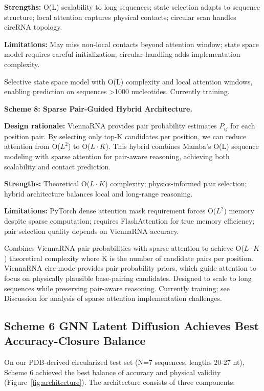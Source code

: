 \documentclass[12pt]{article}
\begin{document}
\textbf{Strengths:} O(L) scalability to long sequences; state selection adapts to sequence structure; local attention captures physical contacts; circular scan handles circRNA topology.

\textbf{Limitations:} May miss non-local contacts beyond attention window; state space model requires careful initialization; circular handling adds implementation complexity.

Selective state space model \citep{gu2023} with O(L) complexity and local attention windows, enabling prediction on sequences >1000 nucleotides. Currently training.

\textbf{Scheme 8: Sparse Pair-Guided Hybrid Architecture.}

\textbf{Design rationale:} ViennaRNA provides pair probability estimates $P_{ij}$ for each position pair. By selecting only top-K candidates per position, we can reduce attention from O($L^2$) to O($L \cdot K$). This hybrid combines Mamba's O(L) sequence modeling with sparse attention for pair-aware reasoning, achieving both scalability and contact prediction.

\textbf{Strengths:} Theoretical O($L \cdot K$) complexity; physics-informed pair selection; hybrid architecture balances local and long-range reasoning.

\textbf{Limitations:} PyTorch dense attention mask requirement forces O($L^2$) memory despite sparse computation; requires FlashAttention for true memory efficiency; pair selection quality depends on ViennaRNA accuracy.

Combines ViennaRNA pair probabilities with sparse attention to achieve O($L \cdot K$) theoretical complexity where K is the number of candidate pairs per position. ViennaRNA circ-mode provides pair probability priors, which guide attention to focus on physically plausible base-pairing candidates. Designed to scale to long sequences while preserving pair-aware reasoning. Currently training; see Discussion for analysis of sparse attention implementation challenges.

\subsection{Scheme 6 GNN Latent Diffusion Achieves Best Accuracy-Closure Balance}

On our PDB-derived circularized test set (N=7 sequences, lengths 20-27 nt), Scheme 6 achieved the best balance of accuracy and physical validity (Figure~\ref{fig:architecture}). The architecture consists of three components:
\end{document}

